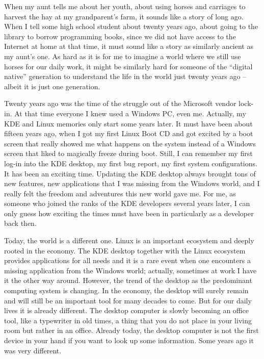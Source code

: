 
\noindent{}When my aunt tells me about her youth, about using horses and carriages to harvest the hay at my grandparent's farm, it sounds like a story of long ago. When I tell some high school student about twenty years ago, about going to the library to borrow programming books, since we did not have access to the Internet at home at that time, it must sound like a story as similarly ancient as my aunt’s one. As hard as it is for me to imagine a world where we still use horses for our daily work, it might be similarly hard for someone of the ``digital native'' generation to understand the life in the world just twenty years ago – albeit it is just one generation.

Twenty years ago was the time of the struggle out of the Microsoft vendor lock-in. At that time everyone I knew used a Windows PC, even me. Actually, my KDE and Linux memories only start some years later. It must have been about fifteen years ago, when I got my first Linux Boot CD and got excited by a boot screen that really showed me what happens on the system instead of a Windows screen that liked to magically freeze during boot. Still, I can remember my first log-in into the KDE desktop, my first bug report, my first system configurations. It has been an exciting time. Updating the KDE desktop always brought tons of new features, new applications that I was missing from the Windows world, and I really felt the freedom and adventures this new world gave me. For me, as someone who joined the ranks of the KDE developers several years later, I can only guess how exciting the times must have been in particularly as a developer back then.

Today, the world is a different one. Linux is an important ecosystem and deeply rooted in the economy. The KDE desktop together with the Linux ecosystem provides applications for all needs and it is a rare event when one encounters a missing application from the Windows world; actually, sometimes at work I have it the other way around. However, the trend of the desktop as the predominant computing system is changing. In the economy, the desktop will surely remain and will still be an important tool for many decades to come. But for our daily lives it is already different. The desktop computer is slowly becoming an office tool, like a typewriter in old times, a thing that you do not place in your living room but rather in an office. Already today, the desktop computer is not the first device in your hand if you want to look up some information. Some years ago it was very different.

